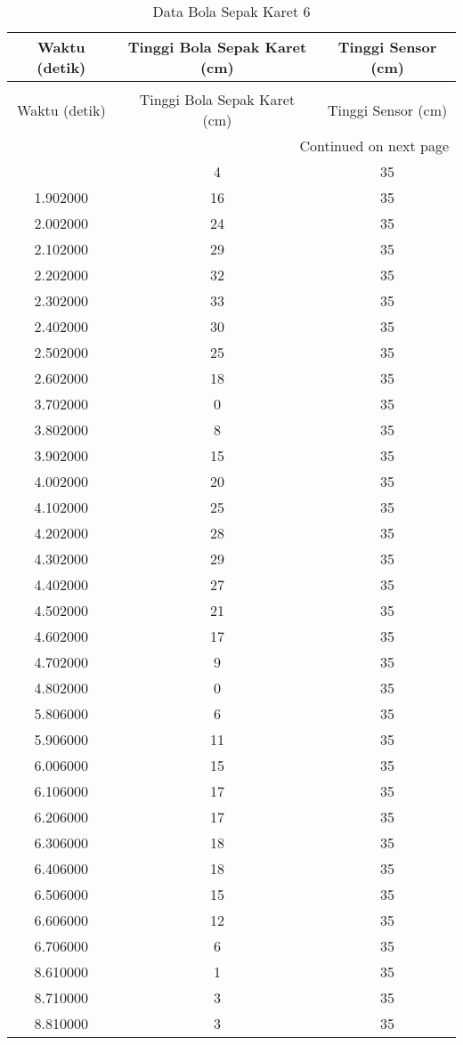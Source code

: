\begin{longtable}[htbp]{|c|c|c|}
\caption{Data Bola Sepak Karet 6} \\
\hline
Waktu (detik) & Tinggi Bola Sepak Karet (cm) & Tinggi Sensor (cm) \\ \hline
\endfirsthead
\caption[]{Data Bola Sepak Karet 6} \\
\hline
Waktu (detik) & Tinggi Bola Sepak Karet (cm) & Tinggi Sensor (cm) \\ \hline
\endhead
\multicolumn{3}{r}{Continued on next page} \\
\endfoot
\endlastfoot
1.802000 & 4 & 35 \\ \hline
1.902000 & 16 & 35 \\ \hline
2.002000 & 24 & 35 \\ \hline
2.102000 & 29 & 35 \\ \hline
2.202000 & 32 & 35 \\ \hline
2.302000 & 33 & 35 \\ \hline
2.402000 & 30 & 35 \\ \hline
2.502000 & 25 & 35 \\ \hline
2.602000 & 18 & 35 \\ \hline
3.702000 & 0 & 35 \\ \hline
3.802000 & 8 & 35 \\ \hline
3.902000 & 15 & 35 \\ \hline
4.002000 & 20 & 35 \\ \hline
4.102000 & 25 & 35 \\ \hline
4.202000 & 28 & 35 \\ \hline
4.302000 & 29 & 35 \\ \hline
4.402000 & 27 & 35 \\ \hline
4.502000 & 21 & 35 \\ \hline
4.602000 & 17 & 35 \\ \hline
4.702000 & 9 & 35 \\ \hline
4.802000 & 0 & 35 \\ \hline
5.806000 & 6 & 35 \\ \hline
5.906000 & 11 & 35 \\ \hline
6.006000 & 15 & 35 \\ \hline
6.106000 & 17 & 35 \\ \hline
6.206000 & 17 & 35 \\ \hline
6.306000 & 18 & 35 \\ \hline
6.406000 & 18 & 35 \\ \hline
6.506000 & 15 & 35 \\ \hline
6.606000 & 12 & 35 \\ \hline
6.706000 & 6 & 35 \\ \hline
8.610000 & 1 & 35 \\ \hline
8.710000 & 3 & 35 \\ \hline
8.810000 & 3 & 35 \\ \hline
\end{longtable}
